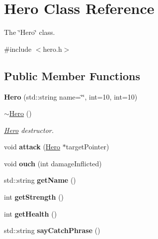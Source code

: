 \hypertarget{classHero}{}\section{Hero Class Reference}
\label{classHero}


The \char`\"{}\+Hero\char`\"{} class.  




{\ttfamily \#include $<$hero.\+h$>$}

\subsection*{Public Member Functions}
\begin{DoxyCompactItemize}
\item 
\mbox{\label{classHero_a433f7b4e1663e5ac5fca2e13ed908301}} 
{\bfseries Hero} (std\+::string name=\char`\"{}\char`\"{}, int=10, int=10)
\item 
\hyperlink{classHero_a5aeef41ede5a80dc29c5acd7b553c4da}{$\sim$\+Hero} ()
\begin{DoxyCompactList}\small\item\em \hyperlink{classHero}{Hero} destructor. \end{DoxyCompactList}\item 
\mbox{\label{classHero_a5667fd65b1f9c26370b99b7cb0d48be1}} 
void {\bfseries attack} (\hyperlink{classHero}{Hero} $\ast$target\+Pointer)
\item 
\mbox{\label{classHero_a57c8ff1f53e2f0d473ee3ad6e8e7800a}} 
void {\bfseries ouch} (int damage\+Inflicted)
\item 
\mbox{\label{classHero_a4edbcb816ca444da6ceed1556d1a21d9}} 
std\+::string {\bfseries get\+Name} ()
\item 
\mbox{\label{classHero_ab28172833ac7157372183abaaa68e054}} 
int {\bfseries get\+Strength} ()
\item 
\mbox{\label{classHero_ac74825f98e0e0473391d5c47881da9b4}} 
int {\bfseries get\+Health} ()
\item 
\mbox{\label{classHero_ac516a12bb462336b15ae6ce9e3422d60}} 
std\+::string {\bfseries say\+Catch\+Phrase} ()
\end{DoxyCompactItemize}


